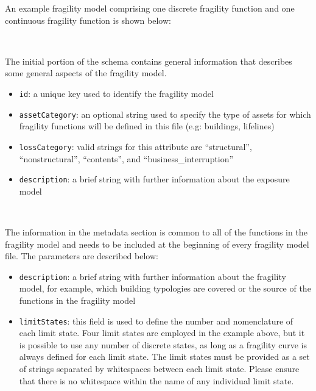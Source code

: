 An example \gls{fragility model} comprising one discrete \gls{fragility
function} and one continuous \gls{fragility function} is shown below:

\inputminted[firstline=1,firstnumber=1,fontsize=\footnotesize,frame=single,linenos,bgcolor=lightgray]{xml}{oqum/risk/Verbatim/input_fragility.xml}\\


The initial portion of the schema contains general information that describes 
some general aspects of the \gls{fragility model}.

\begin{itemize}

    \item \Verb+id+: a unique key used to identify the \gls{fragility model}

    \item \Verb+assetCategory+: an optional string used to specify the type of
    \glspl{asset} for which \glspl{fragility function} will be defined in this
    file (e.g: buildings, lifelines)

    \item \Verb+lossCategory+: valid strings for this attribute are 
    ``structural'', ``nonstructural'', ``contents'', and 
    ``business\_interruption''

    \item \Verb+description+: a brief string with further information about the
    \gls{exposure model}

\end{itemize}

\inputminted[firstline=4,firstnumber=4,lastline=9,fontsize=\footnotesize,frame=single,linenos,bgcolor=lightgray]{xml}{oqum/risk/Verbatim/input_fragility.xml}\\

The information in the metadata section is common to all of the functions in
the \gls{fragility model} and needs to be included at the beginning of every
\gls{fragility model} file. The parameters are described below:

\begin{itemize}

    \item \Verb+description+: a brief string with further information about the
    \gls{fragility model}, for example, which building typologies are covered or 
    the source of the functions in the \gls{fragility model}

    \item \Verb+limitStates+: this field is used to define the number and 
    nomenclature of each limit state. Four limit states are employed in the 
    example above, but it is possible to use any number of discrete states,
    as long as a fragility curve is always defined for each limit state. The 
    limit states must be provided as a set of strings separated by whitespaces 
    between each limit state. Please ensure that there is no whitespace within 
    the name of any individual limit state.

\end{itemize}

